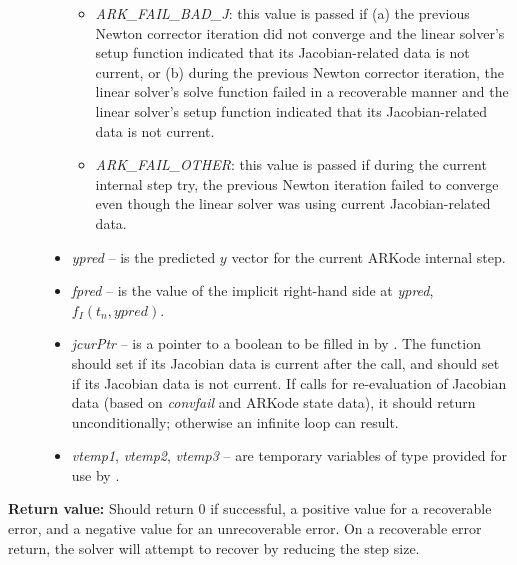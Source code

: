 \documentclass[letterpaper,10pt,english]{sphinxmanual}
\begin{document}
\begin{fulllineitems}
\begin{description}
\begin{itemize}
\begin{itemize}
\item {} 
\emph{ARK\_FAIL\_BAD\_J}: this value is passed if (a) the previous
Newton corrector iteration did not converge and the linear
solver's setup function indicated that its Jacobian-related
data is not current, or (b) during the previous Newton
corrector iteration, the linear solver's solve function
failed in a recoverable manner and the linear solver's setup
function indicated that its Jacobian-related data is not
current.

\item {} 
\emph{ARK\_FAIL\_OTHER}: this value is passed if during the current
internal step try, the previous Newton iteration failed to
converge even though the linear solver was using current
Jacobian-related data.

\end{itemize}

\item {} 
\emph{ypred} -- is the predicted \(y\) vector for the current
ARKode internal step.

\item {} 
\emph{fpred} -- is the value of the implicit right-hand side at
\emph{ypred}, \(f_I(t_n,ypred)\).

\item {} 
\emph{jcurPtr} -- is a pointer to a boolean to be filled in by
{\hyperref[linear_solvers/custom:c.lsetup]{\emph{}}}. The function should set 
if its Jacobian data is current after the call, and should set
 if its Jacobian data is not current. If
{\hyperref[linear_solvers/custom:c.lsetup]{\emph{}}} calls for re-evaluation of Jacobian data
(based on \emph{convfail} and ARKode state data), it should return
 unconditionally; otherwise an infinite
loop can result.

\item {} 
\emph{vtemp1}, \emph{vtemp2}, \emph{vtemp3} -- are temporary variables of
type  provided for use by {\hyperref[linear_solvers/custom:c.lsetup]{\emph{}}}.

\end{itemize}

\end{description}

\textbf{Return value:}
Should return 0 if successful, a positive value
for a recoverable error, and a negative value for an unrecoverable
error.  On a recoverable error return, the solver will attempt to
recover by reducing the step size.

\end{fulllineitems}
\end{document}
